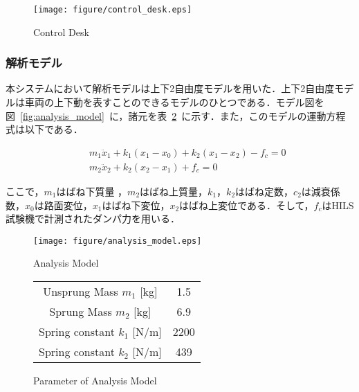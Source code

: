 \documentclass[a4paper,12pt]{article_vdlab_sotsuron}
\begin{document}
 \vspace{10mm}
\begin{figure}[h]
  \centering
  \texttt{[image: figure/control\_desk.eps]}
  \vspace{2mm}
   \caption{Control Desk}
  \label{fig:control_desk}
\end{figure}


\subsubsection{解析モデル}
本システムにおいて解析モデルは上下2自由度モデルを用いた．上下2自由度モデルは車両の上下動を表すことのできるモデルのひとつである\cite{7}．モデル図を図~\ref{fig:analysis_model}~に，諸元を表~\ref{tab:parameter}~に示す．また，このモデルの運動方程式は以下である．

\begin{eqnarray}
 \label{eq:2dof_m1} &&m_1\ddot x_1 + k_1(x_1-x_0) + k_2(x_1-x_2) - f_c = 0\\
 \label{eq:2dof_m2} &&m_2\ddot x_2 + k_2(x_2-x_1) + f_c = 0
\end{eqnarray}

\vspace{10mm}
ここで，$m_1$はばね下質量 ，$m_2$はばね上質量，$k_1$，$k_2$はばね定数，$c_2$は減衰係数，$x_0$は路面変位，$x_1$はばね下変位，$x_2$はばね上変位である．そして，$f_c$はHILS試験機で計測されたダンパ力を用いる．

\vspace*{10mm}
\begin{figure}[htp]
  \begin{minipage}{0.5\textwidth}
    \begin{center}
      \texttt{[image: figure/analysis\_model.eps]}
      \vspace*{3mm}
      \caption{Analysis Model}
      \label{fig:analysis_model}
    \end{center}
  \end{minipage}
  \begin{minipage}{0.5\textwidth}
      \begin{center}
	\makeatletter
	\def\@captype{table}
	\makeatother
	\caption{Parameter of Analysis Model}
	\label{tab:parameter}
	  \begin{tabular}{cc}\hline
	    Unsprung Mass $m_1$ [kg] & 1.5\\
	    Sprung Mass $m_2$ [kg] & 6.9\\
	    Spring constant $k_1$ [N/m] & 2200\\
	    Spring constant $k_2$ [N/m] & 439\\\hline
	  \end{tabular}
	\end{center}
  \end{minipage}
\end{figure}
\end{document}
